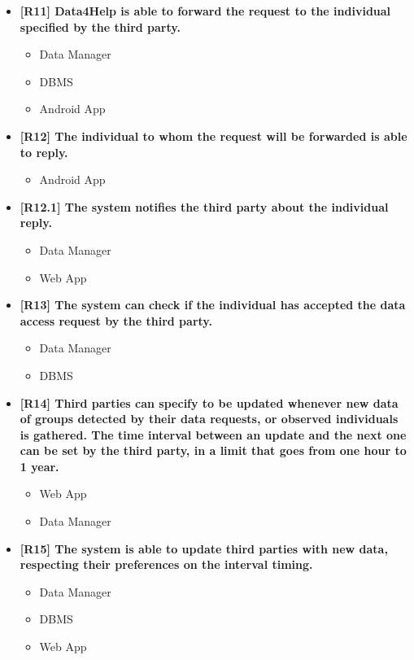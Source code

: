 \begin{itemize}
\item \textbf{[R11] Data4Help is able to forward the request to the individual specified by the third party.}
\begin{itemize}
\item Data Manager
\item DBMS
\item Android App
\end{itemize}

\item \textbf{[R12] The individual to whom the request will be forwarded is able to reply.}
\begin{itemize}
\item Android App
\end{itemize}


\item \textbf{[R12.1] The system notifies the third party about the individual reply.}
\begin{itemize}
\item Data Manager
\item Web App
\end{itemize}


\item \textbf{[R13] The system can check if the individual has accepted the data access request by the third party.}
\begin{itemize}
\item Data Manager
\item DBMS
\end{itemize}

\item \textbf{[R14] Third parties can specify to be updated whenever new data of groups detected by their data requests, or observed individuals is gathered. The time interval between an update and the next one can be set by the third party, in a limit that goes from one hour to 1 year.}
\begin{itemize}
\item Web App
\item Data Manager
\end{itemize}


\item \textbf{[R15] The system is able to update third parties with new data, respecting their preferences on the interval timing.}
\begin{itemize}
\item Data Manager
\item DBMS
\item Web App
\end{itemize}


\end{itemize}
